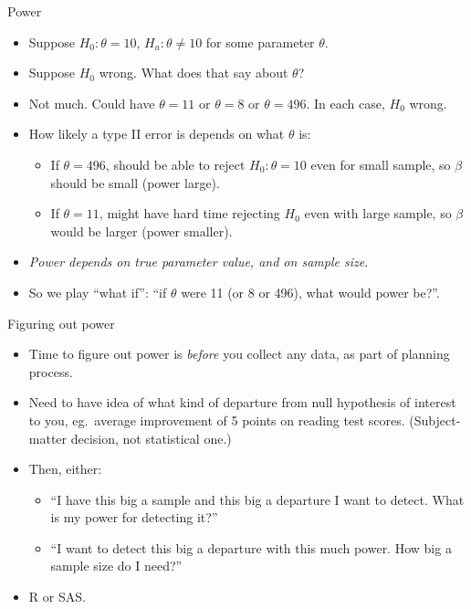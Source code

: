 \documentclass[unknownkeysallowed]{beamer}\usepackage[]{graphicx}\usepackage[]{color}
\begin{document}
  


\begin{frame}[fragile]{Power}
  \begin{itemize}
  \item Suppose $H_0: \theta=10$, $H_a: \theta \ne 10$ for some
    parameter $\theta$.
  \item Suppose $H_0$ wrong. What does that say about $\theta$?
  \item Not much. Could have $\theta=11$ or $\theta=8$ or
    $\theta=496$. In each case, $H_0$ wrong.
  \item How likely a type II error is depends on what $\theta$ is:
    \begin{itemize}
    \item If $\theta=496$, should be able to reject $H_0:\theta=10$
      even for small sample, so $\beta$ should be small (power large).
    \item If $\theta=11$, might have hard time rejecting $H_0$ even
      with large sample, so $\beta$ would be larger (power smaller).
    \end{itemize}
  \item \emph{Power depends on true parameter value, and on sample size.}
  \item So we play ``what if'': ``if $\theta$ were 11 (or 8 or 496),
    what would power be?''.
  \end{itemize}
\end{frame}

\begin{frame}{Figuring out power}

  \begin{itemize}
  \item Time to figure out power is \emph{before} you collect any
    data, as part of planning process.
  \item Need to have idea of what kind of departure from null
    hypothesis of interest to you, eg.\ average improvement of 5 points on
    reading test scores. (Subject-matter decision, not statistical one.)
  \item Then, either:
    \begin{itemize}
    \item ``I have this big a sample and this big a departure I want
      to detect. What is my power for detecting it?''
    \item ``I want to detect this big a departure with this much
      power. How big a sample size do I need?''
    \end{itemize}
  \item R or SAS.
  \end{itemize}
  
\end{frame}
\end{document}
